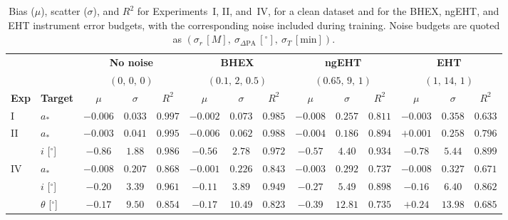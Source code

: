 \begin{table}[ht!]
    \centering
    \caption{Bias ($\mu$), scatter ($\sigma$), and $R^2$ for Experiments~I, II, and~IV,
        for a clean dataset and for the BHEX, ngEHT, and EHT instrument error budgets,
        with the corresponding noise included during training. Noise budgets are quoted as
        $(\sigma_{r}\,[M],\ \sigma_{\Delta\mathrm{PA}}\,[^\circ],\ \sigma_{T}\,[\mathrm{min}])$.}
    \label{tab:results_summary}
    \setlength{\tabcolsep}{4.5pt}
    \small
    \begin{tabular}{ll ccc ccc ccc ccc}
        \hline\hline
        \rule{0pt}{2.5ex}
        & & \multicolumn{3}{c}{\textbf{No noise}} & \multicolumn{3}{c}{\textbf{BHEX}}
          & \multicolumn{3}{c}{\textbf{ngEHT}} & \multicolumn{3}{c}{\textbf{EHT}} \\
        & & \multicolumn{3}{c}{$(0,\,0,\,0)$} & \multicolumn{3}{c}{$(0.1,\,2,\,0.5)$}
          & \multicolumn{3}{c}{$(0.65,\,9,\,1)$} & \multicolumn{3}{c}{$(1,\,14,\,1)$} \\
        \cline{3-5}\cline{6-8}\cline{9-11}\cline{12-14}
        \rule{0pt}{2.5ex}
        \textbf{Exp} & \textbf{Target} & $\mu$ & $\sigma$ & $R^2$ & $\mu$ & $\sigma$ & $R^2$
          & $\mu$ & $\sigma$ & $R^2$ & $\mu$ & $\sigma$ & $R^2$ \\
        \hline
        \rule{0pt}{2.5ex}
        I & $a_*$ & $-0.006$ & $0.033$ & $0.997$ & $-0.002$ & $0.073$ & $0.985$ & $-0.008$ & $0.257$ & $0.811$ & $-0.003$ & $0.358$ & $0.633$ \\
        \hline
        \rule{0pt}{2.5ex}
        II & $a_*$ & $-0.003$ & $0.041$ & $0.995$ & $-0.006$ & $0.062$ & $0.988$ & $-0.004$ & $0.186$ & $0.894$ & $+0.001$ & $0.258$ & $0.796$ \\
         & $i$ [$^\circ$] & $-0.86$ & $1.88$ & $0.986$ & $-0.56$ & $2.78$ & $0.972$ & $-0.57$ & $4.40$ & $0.934$ & $-0.78$ & $5.44$ & $0.899$ \\
        \hline
        \rule{0pt}{2.5ex}
        IV & $a_*$ & $-0.008$ & $0.207$ & $0.868$ & $-0.001$ & $0.226$ & $0.843$ & $-0.003$ & $0.292$ & $0.737$ & $-0.008$ & $0.327$ & $0.671$ \\
         & $i$ [$^\circ$] & $-0.20$ & $3.39$ & $0.961$ & $-0.11$ & $3.89$ & $0.949$ & $-0.27$ & $5.49$ & $0.898$ & $-0.16$ & $6.40$ & $0.862$ \\
         & $\theta$ [$^\circ$] & $-0.17$ & $9.50$ & $0.854$ & $-0.17$ & $10.49$ & $0.823$ & $-0.39$ & $12.81$ & $0.735$ & $+0.24$ & $13.98$ & $0.685$ \\
        \hline
    \end{tabular}
\end{table}

